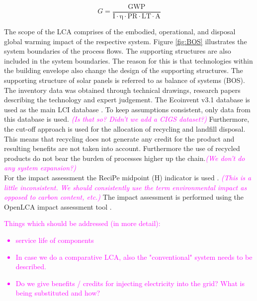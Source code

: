 \begin{equation}
G=\frac{{\mathrm{GWP}}}{{\mathrm{I \cdot \eta  \cdot PR \cdot LT \cdot A}}}
\label{eq:solar}
\end{equation}

The scope of the LCA comprises of the embodied, operational, and disposal global warming impact of the respective system. Figure \ref{fig:BOS} illustrates the system boundaries of the process flows. The supporting structures are also included in the system boundaries. The reason for this is that technologies within the building envelope also change the design of the supporting structures. The supporting structure of solar panels is referred to as balance of systems (BOS).\\

The inventory data was obtained through technical drawings, research papers describing the technology and expert judgement. The Ecoinvent v3.1 database is used as the main LCI database \cite{frischknecht2005ecoinvent}. To keep assumptions consistent, only data from this database is used. \textcolor{magenta}{\textit{(Is that so? Didn't we add a CIGS dataset?)}} Furthermore, the cut-off approach is used for the allocation of recycling and landfill disposal. This means that recycling does not generate any credit for the product and resulting benefits are not taken into account. Furthermore the use of recycled products do not bear the burden of processes higher up the chain.\textcolor{magenta}{\textit{(We don't do any system expansion?)}}\\

For the impact assessment the ReciPe midpoint (H) indicator is used \cite{zelm2009recipe}. \textcolor{magenta}{\textit{(This is a little inconsistent. We should consistently use the term environmental impact as opposed to carbon content, etc.)}} The impact assessment is performed using the OpenLCA impact assessment tool \cite{ciroth2007ict}.\\


\textcolor{magenta}{
Things which should be addressed (in more detail):
\begin{itemize}
\item service life of components
\item In case we do a comparative LCA, also the "conventional" system needs to be described.
\item Do we give benefits / credits for injecting electricity into the grid? What is being substituted and how?
\end{itemize}}